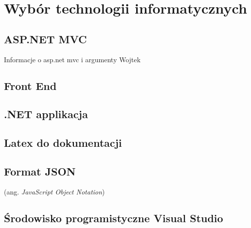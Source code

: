 \newpage\section{Wybór technologii informatycznych} \label{sec:technologie}
\subsection{ASP.NET MVC}
Informacje o asp.net mvc i argumenty {Wojtek}
\subsection{Front End}
\subsection{.NET applikacja}
\subsection{Latex do dokumentacji}
\subsection{Format JSON}
(ang. \textit{JavaScript Object Notation}) \cite{json2017}
\subsection{Środowisko programistyczne Visual Studio}